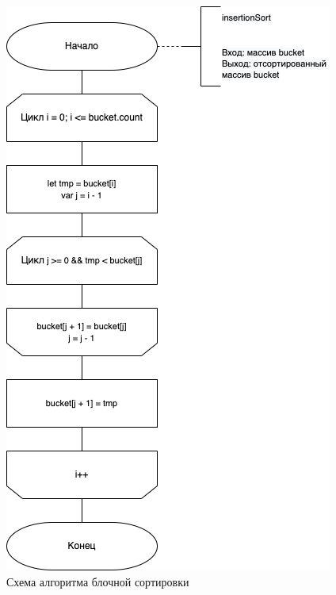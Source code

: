 \begin{figure}[h!]
	\centering
	\includegraphics[width=0.8\linewidth]{img/Insertion.png}
	\caption{Схема алгоритма блочной сортировки}
	\label{fig:mpr}
\end{figure}

